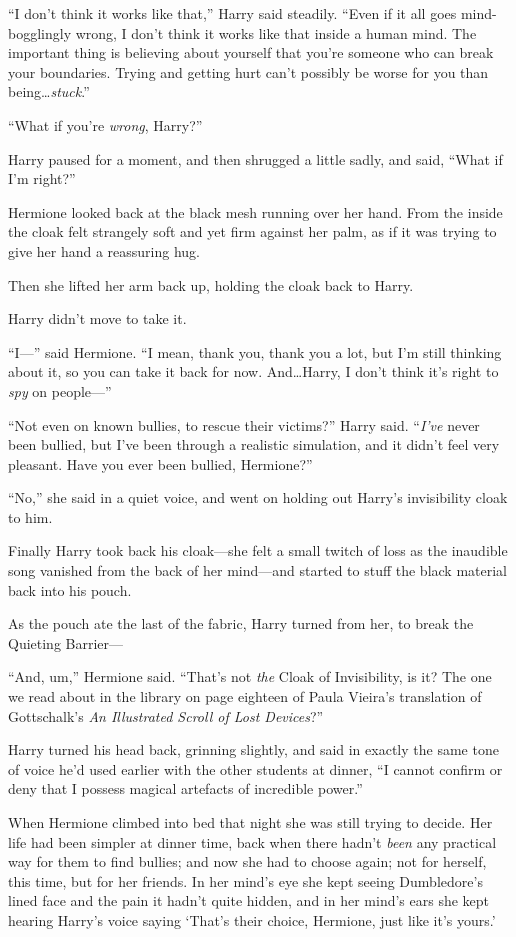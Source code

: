“I don’t think it works like that,” Harry said steadily. “Even if it all goes mind-bogglingly wrong, I don’t think it works like that inside a human mind. The important thing is believing about yourself that you’re someone who can break your boundaries. Trying and getting hurt can’t possibly be worse for you than being…\emph{stuck}.”

“What if you’re \emph{wrong}, Harry?”

Harry paused for a moment, and then shrugged a little sadly, and said, “What if I’m right?”

Hermione looked back at the black mesh running over her hand. From the inside the cloak felt strangely soft and yet firm against her palm, as if it was trying to give her hand a reassuring hug.

Then she lifted her arm back up, holding the cloak back to Harry.

Harry didn’t move to take it.

“I—” said Hermione. “I mean, thank you, thank you a lot, but I’m still thinking about it, so you can take it back for now. And…Harry, I don’t think it’s right to \emph{spy} on people—”

“Not even on known bullies, to rescue their victims?” Harry said. “\emph{I’ve} never been bullied, but I’ve been through a realistic simulation, and it didn’t feel very pleasant. Have you ever been bullied, Hermione?”

“No,” she said in a quiet voice, and went on holding out Harry’s invisibility cloak to him.

Finally Harry took back his cloak—she felt a small twitch of loss as the inaudible song vanished from the back of her mind—and started to stuff the black material back into his pouch.

As the pouch ate the last of the fabric, Harry turned from her, to break the Quieting Barrier—

“And, um,” Hermione said. “That’s not \emph{the} Cloak of Invisibility, is it? The one we read about in the library on page eighteen of Paula Vieira’s translation of Gottschalk’s \emph{An Illustrated Scroll of Lost Devices}?”

Harry turned his head back, grinning slightly, and said in exactly the same tone of voice he’d used earlier with the other students at dinner, “I cannot confirm or deny that I possess magical artefacts of incredible power.”

\later

When Hermione climbed into bed that night she was still trying to decide. Her life had been simpler at dinner time, back when there hadn’t \emph{been} any practical way for them to find bullies; and now she had to choose again; not for herself, this time, but for her friends. In her mind’s eye she kept seeing Dumbledore’s lined face and the pain it hadn’t quite hidden, and in her mind’s ears she kept hearing Harry’s voice saying ‘That’s their choice, Hermione, just like it’s yours.’

